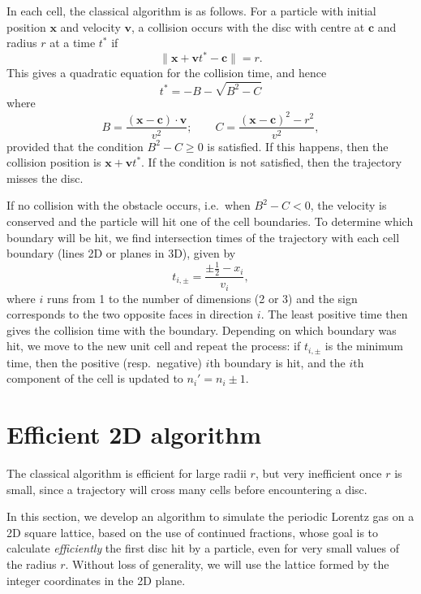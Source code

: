 \documentclass[pre,amsmath,amssymb, twocolumn, showpacs]{revtex4-1}
\renewcommand{\vec}[1]{\mathbf{#1}}
\begin{document}
In each cell, the classical algorithm is as follows. 
For a particle with initial position $\vec{x}$ and velocity $\vec{v}$, a collision occurs with the disc with centre at $\vec{c}$ and radius $r$ at a time $t^{\ast}$ if
\begin{equation}
\| \vec{x} + \vec{v} t^{\ast} - \vec{c} \| = r.
\end{equation}
This gives a quadratic equation for the collision time, and hence
\begin{equation}
t^{\ast} = -B - \sqrt{B^2 - C}
\label{eq:collision_time}
\end{equation}
where
\begin{equation}
B= \frac{(\vec{x}  -\vec{c}) \cdot \vec{v}}{v^2}; \qquad
C= \frac{(\vec{x} - \vec{c})^2 -r^2}{v^2},
\end{equation}
provided that the condition $B^2 - C \ge 0$ is satisfied. If this happens, then the collision position is $\vec{x} + \vec{v} t^{\ast}$. If the condition is not satisfied, then the trajectory misses the disc.


If no collision with the obstacle occurs, i.e.\ when $B^{2} - C < 0$, the velocity is conserved and the particle will hit one of the cell boundaries. To determine which boundary will be hit, we find intersection times of the trajectory with each cell boundary (lines 2D or planes in 3D), given by
$$t_{i, \pm} = \frac{\pm \frac{1}{2} - x_i}{v_i},$$
where $i$ runs from 1 to the number of dimensions (2 or 3) and the sign corresponds to the two opposite faces in direction $i$. The least positive time then gives the collision time with the boundary. Depending on which boundary was hit, we move to the new unit cell and repeat the process: if $t_{i,\pm}$ is the minimum time, then the positive (resp.~negative) $i$th boundary is hit, and the $i$th component of the cell is updated to $n_{i}' = n_{i} \pm 1$.

\section{Efficient 2D algorithm}

The classical algorithm is efficient for large radii $r$, but very inefficient once $r$ is small, since a trajectory will cross many cells before encountering a disc.

In this section, we develop an algorithm to simulate the periodic Lorentz gas on a 2D square lattice, based on the use of continued fractions, whose
 goal is to calculate \emph{efficiently} the first disc hit by a particle, even for very small values of the radius $r$. Without loss of generality, we will use the lattice formed by the integer coordinates in the 2D plane. 
 
\end{document}
